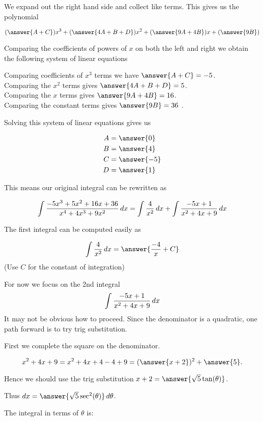 \documentclass{ximera}
\begin{document}
\begin{exercise}
\begin{exercise}
We expand out the right hand side and collect like terms. This gives us the polynomial

\[
(\answer{A+C})x^{3}+(\answer{4A+B+D})x^{2}+(\answer{9A+4B})x+(\answer{9B})
\]


\begin{exercise}

Comparing the coefficients of powers of $x$ on both the left and right we obtain the following system of linear equations

Comparing coefficients of $x^{3}$ terms we have $\answer{A+C}=-5$. \\
Comparing the $x^{2}$ terms gives $\answer {4A+B+D}=5$. \\
Comparing the $x$ terms gives $\answer{9A+4B}=16$. \\
Comparing the constant terms gives $\answer{9B}=36$ .

Solving this system of linear equations gives us

\begin{align*}
A&=\answer{  0 }\\
B&=\answer{4   }\\
C&=\answer{  -5 }\\
D&=\answer{1    }
\end{align*}


This means our original integral can be rewritten as 

\[
\int \frac{-5x^{3}+5x^{2}+16x+36}{x^{4}+4x^{3}+9x^{2}} \mathop{}\!d x= \int \frac{4}{x^{2}} \mathop{}\!d x + \int \frac{-5x+1}{x^{2}+4x+9} \mathop{}\!d x 
\]

The first integral can be computed easily as

\[
\int \frac{4}{x^{2}} \d x=\answer{\frac{-4}{x}+C}
\]
(Use $C$ for the constant of integration)

\begin{exercise}

For now we focus on the 2nd integral 
\[
\int \frac{-5x+1}{x^{2}+4x+9} \mathop{}\!d x 
\]
It may not be obvious how to proceed. Since the denominator is a quadratic, one path forward is to try trig substitution.

First we complete the square on the denominator. 

\[
x^{2}+4x+9=x^{2}+4x+4-4+9=(\answer{x+2})^2+\answer{5}.
\]

Hence we should use the trig substitution $x+2=\answer{\sqrt{5}\tan(\theta)}$. 

Thus $\d x=\answer{ \sqrt{5} \sec^{2}(\theta)} \d \theta$. 

The integral in terms of $\theta$ is:


\end{exercise}
\end{exercise}
\end{exercise}
\end{exercise}
\end{document}
